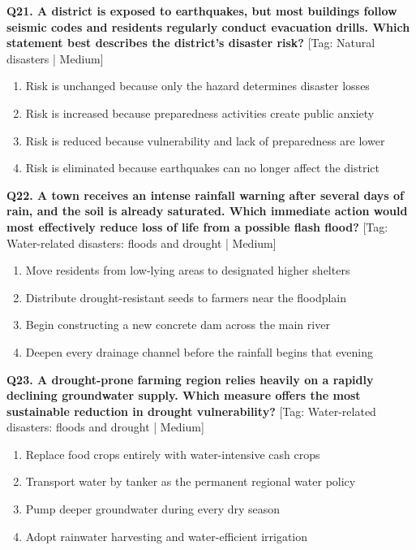 \noindent\textbf{Q21. A district is exposed to earthquakes, but most buildings follow seismic codes and residents regularly conduct evacuation drills. Which statement best describes the district's disaster risk?} \hfill [Tag: Natural disasters | Medium]
\begin{enumerate}[label=(\alph*),topsep=2pt,itemsep=1pt,partopsep=0pt,parsep=0pt]
    \item {Risk is unchanged because only the hazard determines disaster losses}
    \item {Risk is increased because preparedness activities create public anxiety}
    \item {Risk is reduced because vulnerability and lack of preparedness are lower}
    \item {Risk is eliminated because earthquakes can no longer affect the district}
\end{enumerate}
\vspace{2mm}

\noindent\textbf{Q22. A town receives an intense rainfall warning after several days of rain, and the soil is already saturated. Which immediate action would most effectively reduce loss of life from a possible flash flood?} \hfill [Tag: Water-related disasters: floods and drought | Medium]
\begin{enumerate}[label=(\alph*),topsep=2pt,itemsep=1pt,partopsep=0pt,parsep=0pt]
    \item {Move residents from low-lying areas to designated higher shelters}
    \item {Distribute drought-resistant seeds to farmers near the floodplain}
    \item {Begin constructing a new concrete dam across the main river}
    \item {Deepen every drainage channel before the rainfall begins that evening}
\end{enumerate}
\vspace{2mm}

\noindent\textbf{Q23. A drought-prone farming region relies heavily on a rapidly declining groundwater supply. Which measure offers the most sustainable reduction in drought vulnerability?} \hfill [Tag: Water-related disasters: floods and drought | Medium]
\begin{enumerate}[label=(\alph*),topsep=2pt,itemsep=1pt,partopsep=0pt,parsep=0pt]
    \item {Replace food crops entirely with water-intensive cash crops}
    \item {Transport water by tanker as the permanent regional water policy}
    \item {Pump deeper groundwater during every dry season}
    \item {Adopt rainwater harvesting and water-efficient irrigation}
\end{enumerate}
\vspace{2mm}

